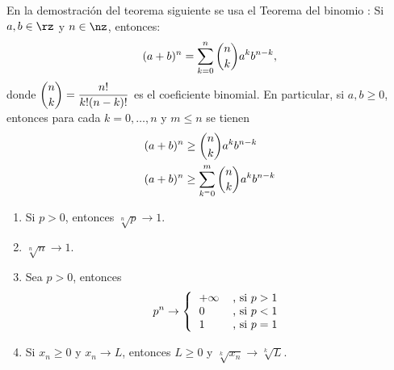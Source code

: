 En la demostraci\'{o}n del teorema siguiente se usa el Teorema del binomio%
%
: Si $a,b\in\rz$ y $n\in\nz$, entonces:
\begin{equation}
(a+b)^{n}=\sum_{k=0}^{n}\dbinom{n}{k}a^{k}b^{n-k},
\end{equation}
donde $\dbinom{n}{k}=\dfrac{n!}{k!(n-k)!}$ es el coeficiente binomial. En
particular, si $a,b\geq0$, entonces para cada $k=0,\dots,n$ y $m\leq n$ se
tienen
\begin{align}
(a+b)^{n}  &  \geq\dbinom{n}{k}a^{k}b^{n-k}\\
(a+b)^{n}  &  \geq\sum_{k^{=}0}^{m}\dbinom{n}{k}a^{k}b^{n-k}%
\end{align}


\begin{theorem}
\label{raizndep} \hfil
\begin{enumerate}
\item Si $p>0$, entonces $\sqrt[n]{p}\rightarrow1$.

\item $\sqrt[n]{n}\rightarrow1$.

\item Sea $p>0$, entonces
\[
p^{n}\rightarrow\left\{
\begin{tabular}
[c]{ll}%
$+\infty$ & , si $p>1$\\
$0$ & , si $p<1$\\
$1$ & , si $p=1$%
\end{tabular}
\right.
\]


\item Si $x_{n}\geq0$ y $x_{n}\rightarrow L$, entonces $L\geq0$ y
$\sqrt[k]{x_{n}}\rightarrow\sqrt[k]{L}$.
\end{enumerate}
\end{theorem}

